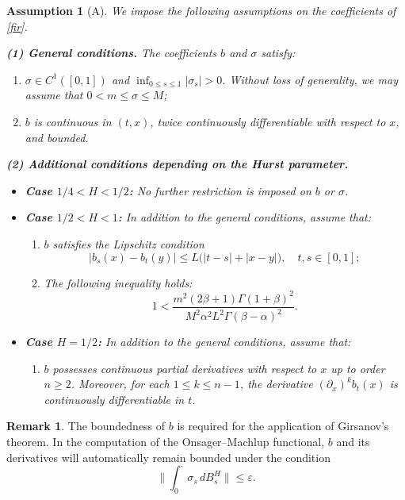\documentclass[preprint,12pt]{elsarticle}
\theoremstyle{definition}  %
\newtheorem{remark}{Remark}
\theoremstyle{plain}  %
\newtheorem*{assumption}{Assumption}
\begin{document}
 \begin{assumption}[A]\label{ass:A}
We impose the following assumptions on the coefficients of \eqref{fir}.

\textbf{(1) General conditions.}
The coefficients \(b\) and \(\sigma\) satisfy:
\begin{enumerate}
    \item $\sigma \in C^1([0,1])$ and $\inf_{0 \leq s \leq 1} |\sigma_s| > 0$. 
    Without loss of generality, we may assume that $0 < m \leq \sigma \leq M$;
    \item $b$ is continuous in $(t,x)$, twice continuously differentiable with respect to $x$, and bounded.
\end{enumerate}

\textbf{(2) Additional conditions depending on the Hurst parameter.}
\begin{itemize}
    \item[\textbf{(A1)}] \textbf{Case \(1/4 < H < 1/2\):}  
    No further restriction is imposed on \(b\) or \(\sigma\).

    \item[\textbf{(A2)}] \textbf{Case \(1/2 < H < 1\):}  
    In addition to the general conditions, assume that:
    \begin{enumerate}
        \item $b$ satisfies the Lipschitz condition
        \[
           |b_s(x) - b_t(y)| \leq L \big( |t-s| + |x-y| \big),\quad t,s\in[0,1];
        \]
        \item The following inequality holds:
        \[
           1 < \frac{m^2 (2\beta+1)\Gamma(1+\beta)^2}
                    {M^2 \alpha^2 L^2 \Gamma(\beta-\alpha)^2}.
        \]
    \end{enumerate}

    \item[\textbf{(A3)}] \textbf{Case \(H = 1/2\):}  
    In addition to the general conditions, assume that:
    \begin{enumerate}
        \item $b$ possesses continuous partial derivatives with respect to $x$ up to order $n \geq 2$. 
        Moreover, for each $1 \leq k \leq n-1$, the derivative $(\partial_x)^k b_t(x)$ 
        is continuously differentiable in $t$.
    \end{enumerate}
\end{itemize}
\end{assumption}

\begin{remark}
The boundedness of $b$ is required for the application of Girsanov’s theorem. 
In the computation of the Onsager--Machlup functional, $b$ and its derivatives 
will automatically remain bounded under the condition 
\[
\Big\| \int_0^\cdot \sigma_s \, dB^H_s \Big\| \leq \varepsilon.
\]
\end{remark}
\end{document}
